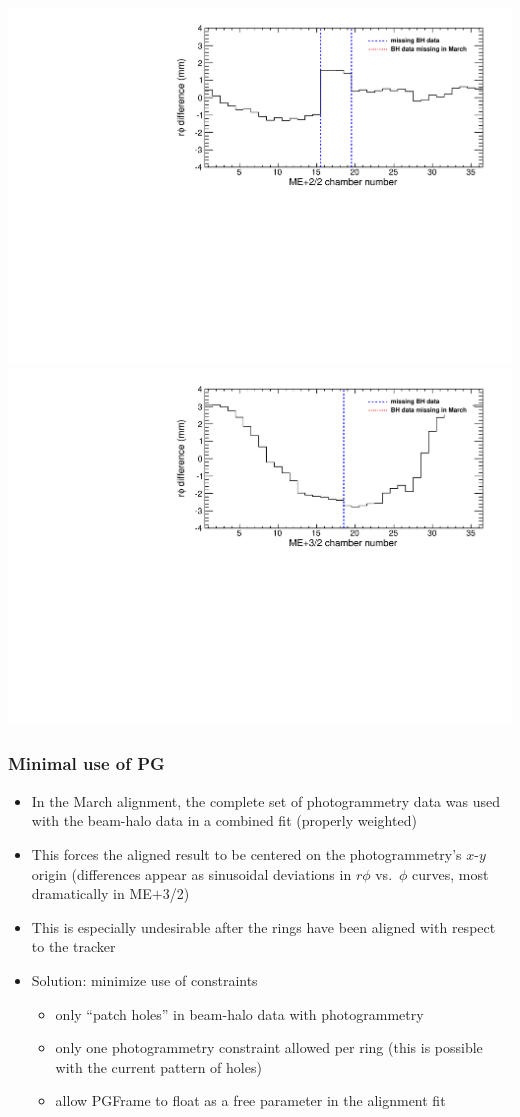\documentclass[compress]{beamer}
\begin{document}
\begin{frame}
\begin{itemize}
\includegraphics[width=0.5\linewidth]{withPGtoNoPG_mep22.pdf}
\includegraphics[width=0.5\linewidth]{withPGtoNoPG_mep32.pdf}

\end{itemize}
\end{frame}

\begin{frame}
\frametitle{Minimal use of PG}

\begin{itemize}
\item In the March alignment, the complete set of photogrammetry data
  was used with the beam-halo data in a combined fit (properly weighted)
\item This forces the aligned result to be centered on the
  photogrammetry's $x$-$y$ origin (differences appear as sinusoidal
  deviations in $r\phi$ vs.\ $\phi$ curves, most dramatically in ME$+$3/2)
\item This is especially undesirable after the rings have been aligned
  with respect to the tracker
\item Solution: minimize use of constraints
\begin{itemize}
\item only ``patch holes'' in beam-halo data with photogrammetry
\item only one photogrammetry constraint allowed per ring (this is possible with the current pattern of holes)
\item allow PGFrame to float as a free parameter in the alignment fit
\end{itemize}
\end{itemize}
\end{frame}
\end{document}
